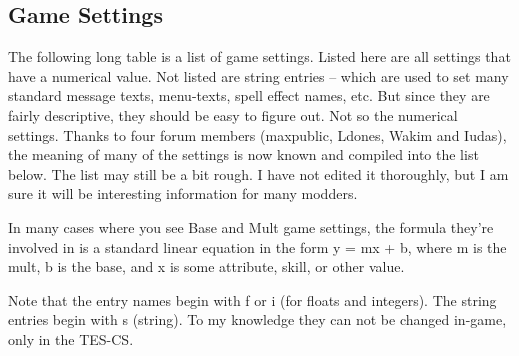 \hypertarget{game-settings}{%
\subsection{\texorpdfstring{\hfill\break
Game Settings}{ Game Settings}}\label{game-settings}}

The following long table is a list of game settings. Listed here are all
settings that have a numerical value. Not listed are string entries --
which are used to set many standard message texts, menu-texts, spell
effect names, etc. But since they are fairly descriptive, they should be
easy to figure out. Not so the numerical settings. Thanks to four forum
members (maxpublic, Ldones, Wakim and Iudas), the meaning of many of the
settings is now known and compiled into the list below. The list may
still be a bit rough. I have not edited it thoroughly, but I am sure it
will be interesting information for many modders.

In many cases where you see Base and Mult game settings, the formula
they're involved in is a standard linear equation in the form y = mx +
b, where m is the mult, b is the base, and x is some attribute, skill,
or other value.

Note that the entry names begin with f or i (for floats and integers).
The string entries begin with s (string). To my knowledge they can not
be changed in-game, only in the TES-CS.

